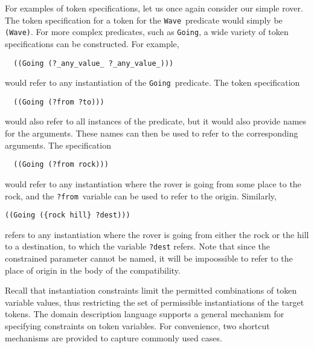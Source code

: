 For examples of token specifications, let us once again consider our
simple rover.  The token specification for a token for the {\tt Wave}\
predicate would simply be {\tt (Wave)}.  For more complex predicates,
such as {\tt Going}, a wide variety of token specifications can be
constructed.  For example,
  \begin{verbatim}
  ((Going (?_any_value_ ?_any_value_))) \end{verbatim}
  would refer to any instantiation of the {\tt Going}\ predicate.  The
token specification
  \begin{verbatim}
  ((Going (?from ?to))) \end{verbatim}
  would also refer to all instances of the predicate, but it would
also provide names for the arguments.  These names can then be used to
refer to the corresponding arguments.  The specification
  \begin{verbatim}
  ((Going (?from rock))) \end{verbatim}
  would refer to any instantiation where the rover is going from some
place to the rock, and the {\tt ?from}\ variable can be used to refer
to the origin.  Similarly,
  \begin{verbatim}
((Going ({rock hill} ?dest))) \end{verbatim} refers to any
instantiation where the rover is going from either the rock or the
hill to a destination, to which the variable {\tt ?dest} refers.  Note
that since the constrained parameter cannot be named, it will be
impoossible to refer to the place of origin in the body of the
compatibility.




Recall that instantiation constraints limit the permitted combinations
of token variable values, thus restricting the set of permissible
instantiations of the target tokens.  The domain description language
supports a general mechanism for specifying constraints on token
variables.  For convenience, two shortcut mechanisms are provided to 
capture commonly used cases.

